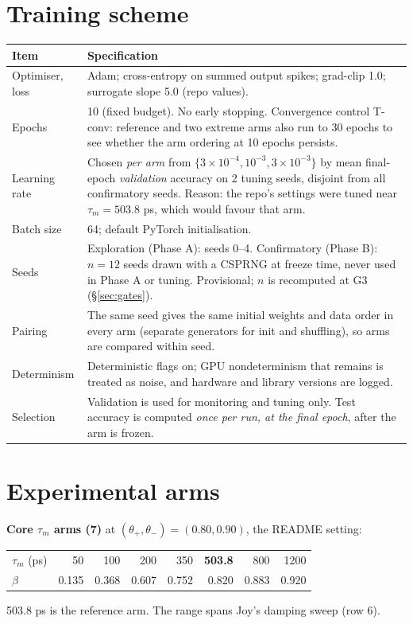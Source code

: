 \documentclass[10pt,a4paper]{article}
\newcommand{\taum}{\tau_m}
\begin{document}
\section{Training scheme}\label{sec:train}
\begin{center}\small
\begin{tabularx}{\textwidth}{@{}L{3.4cm}X@{}}
\toprule Item & Specification\\ \midrule
Optimiser, loss & Adam; cross-entropy on summed output spikes; grad-clip 1.0; surrogate slope 5.0 (repo values).\\
Epochs & 10 (fixed budget). No early stopping. Convergence control T-conv: reference and two extreme arms also run to 30 epochs to see whether the arm ordering at 10 epochs persists.\\
Learning rate & Chosen \emph{per arm} from $\{3\times10^{-4},10^{-3},3\times10^{-3}\}$ by mean final-epoch \emph{validation} accuracy on 2 tuning seeds, disjoint from all confirmatory seeds. Reason: the repo's settings were tuned near $\taum=503.8$ ps, which would favour that arm.\\
Batch size & 64; default PyTorch initialisation.\\
Seeds & Exploration (Phase A): seeds 0--4. Confirmatory (Phase B): $n=12$ seeds drawn with a CSPRNG at freeze time, never used in Phase A or tuning. Provisional; $n$ is recomputed at G3 (\S\ref{sec:gates}).\\
Pairing & The same seed gives the same initial weights and data order in every arm (separate generators for init and shuffling), so arms are compared within seed.\\
Determinism & Deterministic flags on; GPU nondeterminism that remains is treated as noise, and hardware and library versions are logged.\\
Selection & Validation is used for monitoring and tuning only. Test accuracy is computed \emph{once per run, at the final epoch}, after the arm is frozen.\\
\bottomrule\end{tabularx}
\end{center}

\section{Experimental arms}\label{sec:arms}
\textbf{Core $\taum$ arms (7)} at $(\theta_+,\theta_-)=(0.80,0.90)$, the README setting:
\begin{center}\small
\begin{tabular}{@{}lrrrrrrr@{}}
\toprule $\taum$ (ps) & 50 & 100 & 200 & 350 & \textbf{503.8} & 800 & 1200\\
$\beta$ & 0.135 & 0.368 & 0.607 & 0.752 & 0.820 & 0.883 & 0.920\\ \bottomrule
\end{tabular}
\end{center}
503.8 ps is the reference arm. The range spans Joy's damping sweep (row 6).
\end{document}
